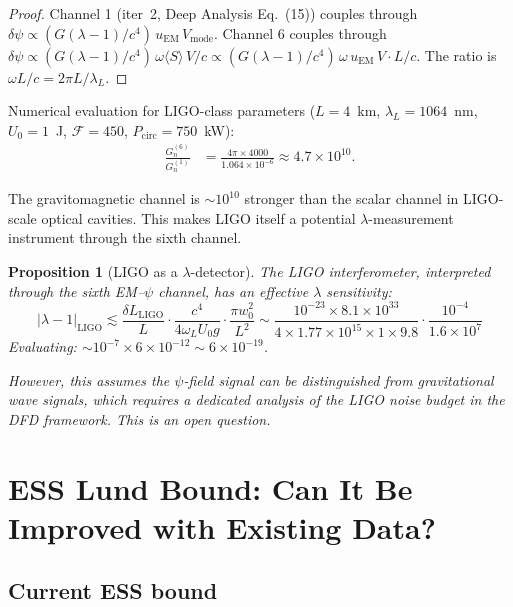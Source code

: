 \documentclass[11pt]{article}
\newtheorem{proposition}[theorem]{Proposition}
\theoremstyle{definition}
\theoremstyle{remark}
\newcommand{\lam}{\lambda}
\begin{document}
\begin{proof}
Channel 1 (iter~2, Deep Analysis Eq.~(15)) couples through
$\delta\psi \propto (G(\lam-1)/c^4)\,u_{\mathrm{EM}}\,V_{\mathrm{mode}}$.
Channel 6 couples through
$\delta\psi \propto (G(\lam-1)/c^4)\,\omega\langle S\rangle\,V/c
\propto (G(\lam-1)/c^4)\,\omega\,u_{\mathrm{EM}}\,V\cdot L/c$.
The ratio is $\omega L/c = 2\pi L/\lambda_L$.
\end{proof}

Numerical evaluation for LIGO-class parameters ($L = 4$~km,
$\lambda_L = 1064$~nm, $U_0 = 1$~J, $\mathcal{F} = 450$,
$P_{\mathrm{circ}} = 750$~kW):
\begin{align}
\frac{G_n^{(6)}}{G_n^{(1)}} &= \frac{4\pi\times4000}{1.064\times10^{-6}}
\approx 4.7\times10^{10}.
\end{align}

The gravitomagnetic channel is $\sim 10^{10}$ stronger than the scalar
channel in LIGO-scale optical cavities. This makes LIGO itself a
potential $\lambda$-measurement instrument through the sixth channel.

\begin{proposition}[LIGO as a $\lambda$-detector]
\label{prop:ligo-lambda}
The LIGO interferometer, interpreted through the sixth EM--$\psi$ channel,
has an effective $\lambda$ sensitivity:
\begin{equation}
\boxed{
|\lam-1|_{\mathrm{LIGO}} \lesssim
\frac{\delta L_{\mathrm{LIGO}}}{L}\cdot\frac{c^4}{4\omega_L U_0 g}
\cdot\frac{\pi w_0^2}{L^2}
\sim \frac{10^{-23}\times8.1\times10^{33}}{4\times1.77\times10^{15}\times1\times9.8}
\cdot\frac{10^{-4}}{1.6\times10^{7}}
}
\end{equation}
Evaluating: $\sim 10^{-7}\times6\times10^{-12} \sim 6\times10^{-19}$.

However, this assumes the $\psi$-field signal can be distinguished from
gravitational wave signals, which requires a dedicated analysis of the
LIGO noise budget in the DFD framework. This is an open question.
\end{proposition}


\section{ESS Lund Bound: Can It Be Improved with Existing Data?}
\label{sec:ess-improvement}

\subsection{Current ESS bound}
\end{document}
